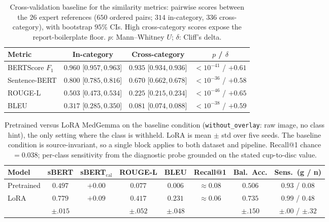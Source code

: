 \documentclass[runningheads]{llncs}
\begin{document}
\begin{table}[t]
  \centering
  \caption{Cross-validation baseline for the similarity metrics: pairwise scores between the $26$ expert references ($650$ ordered pairs; $314$ in-category, $336$ cross-category), with bootstrap $95\%$ CIs. High cross-category scores expose the report-boilerplate floor. $p$: Mann--Whitney $U$; $\delta$: Cliff's delta.}
  \label{tab:xcat}
  \begin{tabular}{lccc}
  \toprule
  Metric & In-category & Cross-category & $p$ / $\delta$ \\
  \midrule
  BERTScore $F_1$ & $0.960$ [$0.957,0.963$] & $0.935$ [$0.934,0.936$] & $<10^{-41}$ / $+0.61$ \\
  Sentence-BERT   & $0.800$ [$0.785,0.816$] & $0.670$ [$0.662,0.678$] & $<10^{-36}$ / $+0.58$ \\
  ROUGE-L         & $0.503$ [$0.473,0.534$] & $0.225$ [$0.215,0.234$] & $<10^{-46}$ / $+0.65$ \\
  BLEU            & $0.317$ [$0.285,0.350$] & $0.081$ [$0.074,0.088$] & $<10^{-38}$ / $+0.59$ \\
  \bottomrule
  \end{tabular}
\end{table}

\begin{table}[t]
  \centering
  \caption{Pretrained versus LoRA MedGemma on the baseline condition (\texttt{without\_overlay}: raw image, no class hint), the only setting where the class is withheld. LoRA is mean $\pm$ std over five seeds. The baseline condition is source-invariant, so a single block applies to both dataset and pipeline. Recall@1 chance $=0.038$; per-class sensitivity from the diagnostic probe grounded on the stated cup-to-disc value.}
  \label{tab:main}
  \setlength{\tabcolsep}{4pt}
  \begin{tabular}{lccccccc}
  \toprule
  Model & sBERT & sBERT$_{\text{cal}}$ & ROUGE-L & BLEU & Recall@1 & Bal.\ Acc. & Sens.\ (g / n) \\
  \midrule
  Pretrained & $0.497$ & $+0.00$ & $0.077$ & $0.006$ & $\approx0.08$ & $0.506$ & $0.93$ / $0.08$ \\
  LoRA & $0.779$ & $+0.09$ & $0.417$ & $0.231$ & $\approx0.06$ & $0.735$ & $0.99$ / $0.48$ \\
      & \scriptsize$\pm.015$ & & \scriptsize$\pm.052$ & \scriptsize$\pm.048$ & & \scriptsize$\pm.150$ & \scriptsize$\pm.00$ / $\pm.32$ \\
  \bottomrule
  \end{tabular}
\end{table}
\end{document}
